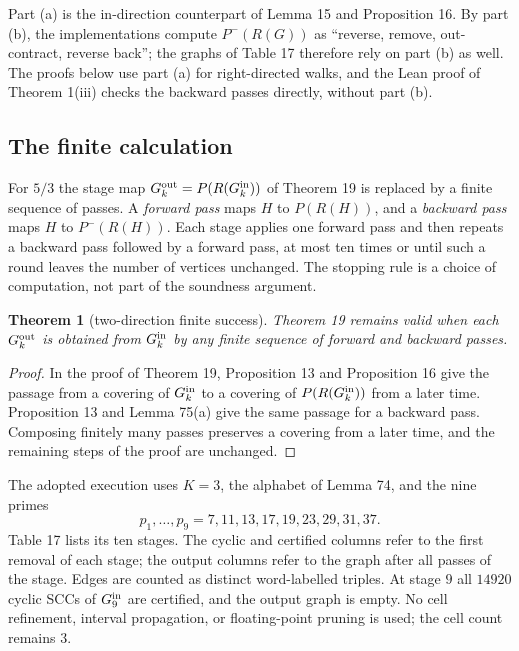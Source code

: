 \documentclass[11pt,reqno]{amsart}
\newtheorem{theorem}{Theorem}
\theoremstyle{definition}
\theoremstyle{remark}
\begin{document}
Part (a) is the in-direction counterpart of Lemma 15 and
Proposition 16. By part (b), the implementations compute
\(P^-(R(G))\) as ``reverse, remove, out-contract, reverse back''; the
graphs of Table 17 therefore rely on part (b) as well. The proofs below use
part (a) for right-directed walks, and the Lean proof of Theorem 1(iii)
checks the backward passes directly, without part (b).

\subsection{The finite calculation}\label{sec:F.3}

For \(5/3\) the stage map \(G_k^{\rm out}=P(R(G_k^{\rm in}))\) of
Theorem 19 is replaced by a finite sequence of passes. A \emph{forward
pass} maps \(H\) to \(P(R(H))\), and a \emph{backward pass} maps \(H\) to
\(P^-(R(H))\). Each stage applies one forward pass and then repeats a
backward pass followed by a forward pass, at most ten times or until
such a round leaves the number of vertices unchanged. The stopping rule
is a choice of computation, not part of the soundness argument.

\begin{samepage}
\begin{theorem}[two-direction finite success]\leavevmode\label{thm:76}
Theorem 19 remains valid when each \(G_k^{\rm out}\) is obtained from
\(G_k^{\rm in}\) by any finite sequence of forward and backward passes.
\label{thm-end:76}
\end{theorem}
\end{samepage}

\begin{proof}\leavevmode\label{proof:76}
In the proof of Theorem 19, Proposition 13 and Proposition 16 give the
passage from a covering of \(G_k^{\rm in}\) to a covering of
\(P(R(G_k^{\rm in}))\) from a later time. Proposition 13 and
Lemma 75(a) give the same passage for a backward pass. Composing
finitely many passes preserves a covering from a later time, and the
remaining steps of the proof are unchanged. \qedhere
\end{proof}

The adopted execution uses \(K=3\), the alphabet of Lemma 74, and the
nine primes
\[
p_1,\ldots,p_9=7,11,13,17,19,23,29,31,37.
\]
Table 17 lists its ten stages. The cyclic and certified columns refer to
the first removal of each stage; the output columns refer to the graph
after all passes of the stage. Edges are counted as distinct
word-labelled triples. At stage \(9\) all \(14920\) cyclic SCCs of
\(G_9^{\rm in}\) are certified, and the output graph is empty. No cell
refinement, interval propagation, or floating-point pruning is used; the
cell count remains \(3\).
\end{document}
